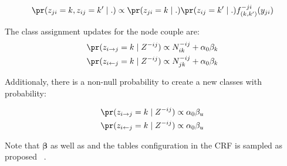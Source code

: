 \begin{equation}
    \pr(z_{ji}=k, z_{ij}=k' \mid .) \propto \pr(z_{ji}=k \mid .) \pr(z_{ij}=k' \mid .) f_{(k,k')}^{-ji}(y_{ji})
\end{equation}


The class assignment updates for the node couple are:
\begin{align}
    \pr(z_{i\rightarrow j} =k \mid Z^{-ij}) &\propto N_{ik}^{-ij} + \alpha_0 \beta_k \\
    \pr(z_{i\leftarrow j} =k \mid Z^{-ij}) &\propto N_{jk}^{-ij} + \alpha_0 \beta_k
\end{align}

Additionaly, there is a non-null probability to create a new classes with probability:

\begin{align}
    \pr(z_{i\rightarrow j} =k \mid Z^{-ij}) &\propto \alpha_0 \beta_u \\
    \pr(z_{i\leftarrow j} =k \mid Z^{-ij}) &\propto \alpha_0 \beta_u \\
\end{align}

Note that $\mathbf{\beta}$ as well as and the tables configuration in the CRF is sampled as proposed ~\cite{HDP}.

